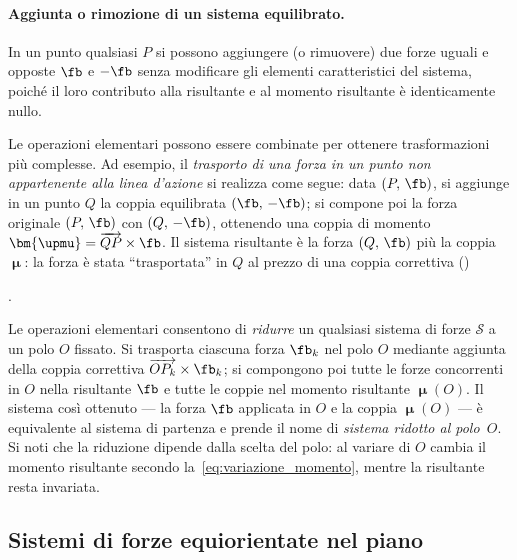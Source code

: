 \paragraph{Aggiunta o rimozione di un sistema equilibrato.}
In un punto qualsiasi $P$ si possono aggiungere (o rimuovere)
due forze uguali e opposte $\fb$ e $-\fb$ senza modificare gli
elementi caratteristici del sistema, poiché il loro contributo
alla risultante e al momento risultante è identicamente nullo.





\begin{oss}
	Le operazioni elementari possono essere combinate per
	ottenere trasformazioni più complesse. Ad esempio, il
	\textit{trasporto di una forza in un punto non appartenente
		alla linea d'azione} si realizza come segue: data
	$(P,\,\fb)$, si aggiunge in un punto $Q$ la coppia
	equilibrata $(\fb,\,-\fb)$; si compone poi la forza
	originale $(P,\,\fb)$ con $(Q,\,-\fb)$, ottenendo una
	coppia di momento
	$\bm{\upmu} = \overrightarrow{QP}\times\fb$. Il sistema
	risultante è la forza $(Q,\,\fb)$ più la coppia
	$\bm{\upmu}$: la forza è stata ``trasportata'' in $Q$ al
	prezzo di una coppia correttiva ()


.
\end{oss}

\begin{oss}
	Le operazioni elementari consentono di \textit{ridurre} un
	qualsiasi sistema di forze $\mathcal{S}$ a un polo $O$
	fissato. Si trasporta ciascuna forza $\fb_k$ nel polo $O$
	mediante aggiunta della coppia correttiva
	$\overrightarrow{OP_k}\times\fb_k$; si compongono poi tutte
	le forze concorrenti in $O$ nella risultante $\fb$ e tutte
	le coppie nel momento risultante $\bm{\upmu}(O)$. Il sistema
	così ottenuto --- la forza $\fb$ applicata in $O$ e la
	coppia $\bm{\upmu}(O)$ --- è equivalente al sistema di
	partenza e prende il nome di \textit{sistema ridotto al
		polo~$O$}. Si noti che la riduzione dipende dalla scelta
	del polo: al variare di $O$ cambia il momento risultante
	secondo la~\eqref{eq:variazione_momento}, mentre la
	risultante resta invariata.
\end{oss}

\subsection{Sistemi di forze equiorientate nel piano}

